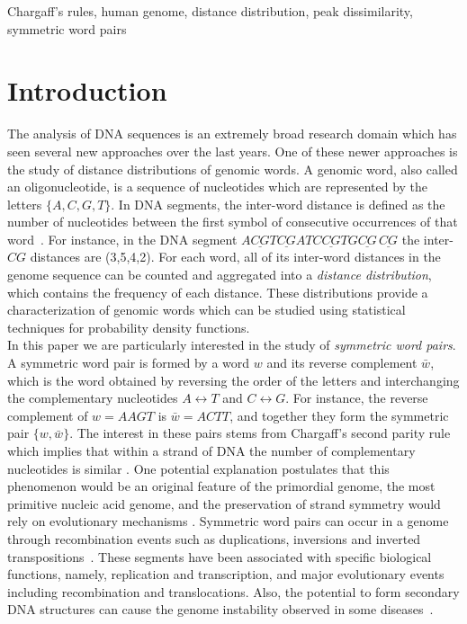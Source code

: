 \documentclass[review,12pt]{elsarticle}
\begin{document}
\begin{frontmatter}
\begin{keyword}
Chargaff's rules, human genome, distance distribution,
peak dissimilarity, symmetric word pairs
\end{keyword}

\end{frontmatter}



\section{Introduction}\label{intro}
The analysis of DNA sequences is an extremely broad
research domain which has seen several new approaches
over the last years. One of these newer approaches is
the study of distance distributions of genomic words.
A genomic word, also called an oligonucleotide, is a
sequence of nucleotides which are represented by the
letters $\{A,C,G,T\}$.
In DNA segments, the inter-word distance is defined as
the number of nucleotides between the first symbol of
consecutive occurrences of that
word~\cite{afreixo2009,Tavares2015}.
For instance, in the DNA segment
$A\underline{CG}T\underline{CG}ATC\underline{CG}TG
 \underline{CG}\,\underline{CG}$ the
inter-$CG$ distances are (3,5,4,2).
For each word, all of its inter-word distances in the genome sequence
can be counted and aggregated into a \emph{distance distribution},
which contains the frequency of each distance.
These distributions provide a characterization of
genomic words which can be studied using statistical
techniques for probability density functions.\\

In this paper we are particularly interested in
the study of {\it symmetric word pairs}.
A symmetric word pair is formed by a word $w$
and its reverse complement $\bar{w}$, which is
the word obtained by reversing the order of the
letters and interchanging the complementary
nucleotides $A \leftrightarrow T$
and $C \leftrightarrow G$. For instance, the
reverse complement of $w=AAGT$
is $\bar{w}=ACTT$, and together they form the
symmetric pair $\{w,\bar{w}\}$.
The interest in these pairs stems from Chargaff's
second parity rule which implies that within a
strand of DNA the number of complementary
nucleotides is similar \cite{forsdyke2000}.
One potential explanation postulates that this
phenomenon would be an original feature of the
primordial genome, the most primitive nucleic acid
genome, and the preservation of strand symmetry
would rely on evolutionary mechanisms
\cite{zhang2010strand}.
%
Symmetric word pairs can occur in a genome through recombination events such as
duplications, inversions and inverted transpositions~\cite{baisnee2002,albrecht2007}.
These segments have been associated with specific biological functions, namely,
replication and transcription, and major evolutionary events including recombination and
translocations. Also, the potential to form secondary DNA structures can cause the
genome instability observed in some diseases~\cite{inagaki2016}.
%
\end{document}
